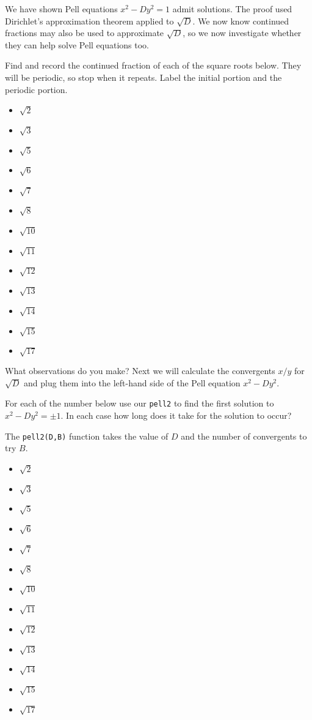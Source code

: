 \documentclass[12pt]{exam}
\begin{document}
\begin{questions}
  \question We have shown Pell equations $x^2-Dy^2=1$ admit solutions. The proof used Dirichlet's approximation theorem applied to $\sqrt{D}$. We now know continued fractions may also be used to approximate $\sqrt{D}$, so we now investigate whether they can help solve Pell equations too.
  
  Find and record the continued fraction of each of the square roots below. They will be periodic, so stop when it repeats. Label the initial portion and the periodic portion.
  \begin{itemize}\itemsep.5cm
    \item $\sqrt{2}$
    \item $\sqrt{3}$
    \item $\sqrt{5}$
    \item $\sqrt{6}$
    \item $\sqrt{7}$
    \item $\sqrt{8}$
    \item $\sqrt{10}$
    \item $\sqrt{11}$
    \item $\sqrt{12}$
    \item $\sqrt{13}$
    \item $\sqrt{14}$
    \item $\sqrt{15}$
    \item $\sqrt{17}$
  \end{itemize}
  
  What observations do you make?
  \newpage
  \question Next we will calculate the convergents $x/y$ for $\sqrt{D}$ and plug them into the left-hand side of the Pell equation $x^2-Dy^2$.
  
  For each of the number below use our \texttt{pell2} to find the first solution to $x^2-Dy^2=\pm1$. In each case how long does it take for the solution to occur?

  The \texttt{pell2(D,B)} function takes the value of $D$ and the number of convergents to try $B$.
  \begin{itemize}\itemsep.5cm
    \item $\sqrt{2}$
    \item $\sqrt{3}$
    \item $\sqrt{5}$
    \item $\sqrt{6}$
    \item $\sqrt{7}$
    \item $\sqrt{8}$
    \item $\sqrt{10}$
    \item $\sqrt{11}$
    \item $\sqrt{12}$
    \item $\sqrt{13}$
    \item $\sqrt{14}$
    \item $\sqrt{15}$
    \item $\sqrt{17}$
  \end{itemize}
  

\end{questions}
\end{document}
